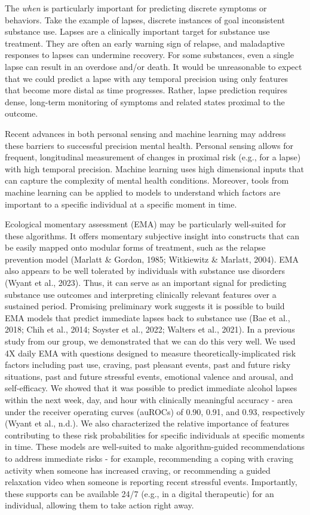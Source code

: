\documentclass[
]{agujournal2019}
\begin{document}
The \emph{when} is particularly important for predicting discrete
symptoms or behaviors. Take the example of lapses, discrete instances of
goal inconsistent substance use. Lapses are a clinically important
target for substance use treatment. They are often an early warning sign
of relapse, and maladaptive responses to lapses can undermine recovery.
For some substances, even a single lapse can result in an overdose
and/or death. It would be unreasonable to expect that we could predict a
lapse with any temporal precision using only features that become more
distal as time progresses. Rather, lapse prediction requires dense,
long-term monitoring of symptoms and related states proximal to the
outcome.

Recent advances in both personal sensing and machine learning may
address these barriers to successful precision mental health. Personal
sensing allows for frequent, longitudinal measurement of changes in
proximal risk (e.g., for a lapse) with high temporal precision. Machine
learning uses high dimensional inputs that can capture the complexity of
mental health conditions. Moreover, tools from machine learning can be
applied to models to understand which factors are important to a
specific individual at a specific moment in time.

Ecological momentary assessment (EMA) may be particularly well-suited
for these algorithms. It offers momentary subjective insight into
constructs that can be easily mapped onto modular forms of treatment,
such as the relapse prevention model (Marlatt \& Gordon, 1985;
Witkiewitz \& Marlatt, 2004). EMA also appears to be well tolerated by
individuals with substance use disorders (Wyant et al., 2023). Thus, it
can serve as an important signal for predicting substance use outcomes
and interpreting clinically relevant features over a sustained period.
Promising preliminary work suggests it is possible to build EMA models
that predict immediate lapses back to substance use (Bae et al., 2018;
Chih et al., 2014; Soyster et al., 2022; Walters et al., 2021). In a
previous study from our group, we demonstrated that we can do this very
well. We used 4X daily EMA with questions designed to measure
theoretically-implicated risk factors including past use, craving, past
pleasant events, past and future risky situations, past and future
stressful events, emotional valence and arousal, and self-efficacy. We
showed that it was possible to predict immediate alcohol lapses within
the next week, day, and hour with clinically meaningful accuracy - area
under the receiver operating curves (auROCs) of 0.90, 0.91, and 0.93,
respectively (Wyant et al., n.d.). We also characterized the relative
importance of features contributing to these risk probabilities for
specific individuals at specific moments in time. These models are
well-suited to make algorithm-guided recommendations to address
immediate risks - for example, recommending a coping with craving
activity when someone has increased craving, or recommending a guided
relaxation video when someone is reporting recent stressful events.
Importantly, these supports can be available 24/7 (e.g., in a digital
therapeutic) for an individual, allowing them to take action right away.
\end{document}
